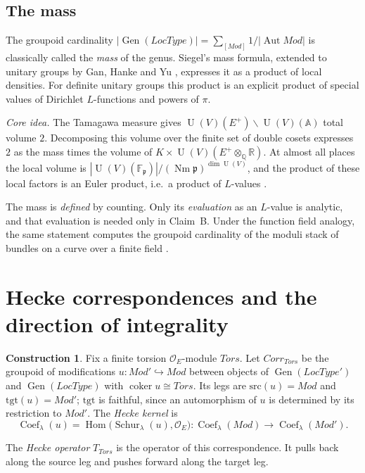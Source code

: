 \documentclass[11pt]{amsart}
\theoremstyle{definition}
\newtheorem{construction}[theorem]{Construction}
\theoremstyle{remark}
\newcommand{\OEring}{\mathcal{O}_E}
\newcommand{\Md}{\mathit{Mod}}
\newcommand{\Tors}{\mathit{Tors}}
\newcommand{\Corr}{\mathit{Corr}}
\newcommand{\LocType}{\mathit{LocType}}
\newcommand{\src}{\mathrm{src}}
\newcommand{\tgt}{\mathrm{tgt}}
\DeclareMathOperator{\Hom}{Hom}
\DeclareMathOperator{\Aut}{Aut}
\DeclareMathOperator{\Gen}{Gen}
\DeclareMathOperator{\Coef}{Coef}
\DeclareMathOperator{\Schur}{Schur}
\DeclareMathOperator{\Nm}{Nm}
\DeclareMathOperator{\coker}{coker}
\DeclareMathOperator{\U}{U}
\newcommand{\A}{\mathbb{A}}
\newcommand{\Q}{\mathbb{Q}}
\newcommand{\R}{\mathbb{R}}
\newcommand{\F}{\mathbb{F}}
\newcommand{\pp}{\mathfrak{p}}
\begin{document}
\subsection{The mass}\label{subsec:mass}
The groupoid cardinality $|\Gen(\LocType)|=\sum_{[\Md]}1/|\Aut\Md|$ is classically called the \emph{mass} of the genus. Siegel's mass formula, extended to unitary groups by Gan, Hanke and Yu \cite{GHY}, expresses it as a product of local densities. For definite unitary groups this product is an explicit product of special values of Dirichlet $L$-functions and powers of $\pi$.

\noindent\emph{Core idea.} The Tamagawa measure gives $\U(V)(E^+)\backslash\U(V)(\A)$ total volume $2$. Decomposing this volume over the finite set of double cosets expresses $2$ as the mass times the volume of $K\times\U(V)(E^+\otimes_{\Q}\R)$. At almost all places the local volume is $|\U(V)(\F_\pp)|/(\Nm\pp)^{\dim\U(V)}$, and the product of these local factors is an Euler product, i.e.\ a product of $L$-values \cite{Gross-motive}.

The mass is \emph{defined} by counting. Only its \emph{evaluation} as an $L$-value is analytic, and that evaluation is needed only in Claim~B. Under the function field analogy, the same statement computes the groupoid cardinality of the moduli stack of bundles on a curve over a finite field \cite{nLab-FFA}.

\section{Hecke correspondences and the direction of integrality}\label{sec:hecke}

\begin{construction}\label{con:hecke}
Fix a finite torsion $\OEring$-module $\Tors$. Let $\Corr_{\Tors}$ be the groupoid of modifications $u\colon\Md'\hookrightarrow\Md$ between objects of $\Gen(\LocType')$ and $\Gen(\LocType)$ with $\coker u\cong\Tors$. Its legs are $\src(u)=\Md$ and $\tgt(u)=\Md'$; $\tgt$ is faithful, since an automorphism of $u$ is determined by its restriction to $\Md'$. The \emph{Hecke kernel} is
\[
\Coef_\lambda(u)=\Hom\bigl(\Schur_\lambda(u),\OEring\bigr)\colon\Coef_\lambda(\Md)\to\Coef_\lambda(\Md').
\]
\end{construction}

The \emph{Hecke operator} $T_{\Tors}$ is the operator of this correspondence. It pulls back along the source leg and pushes forward along the target leg.
\end{document}
